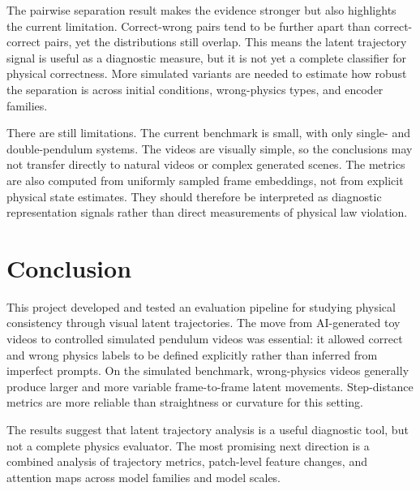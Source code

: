 \documentclass[final-report]{report-template}
\begin{document}
The pairwise separation result makes the evidence stronger but also highlights
the current limitation. Correct-wrong pairs tend to be further apart than
correct-correct pairs, yet the distributions still overlap. This means the
latent trajectory signal is useful as a diagnostic measure, but it is not yet a
complete classifier for physical correctness. More simulated variants are
needed to estimate how robust the separation is across initial conditions,
wrong-physics types, and encoder families.

There are still limitations. The current benchmark is small, with only single-
and double-pendulum systems. The videos are visually simple, so the conclusions
may not transfer directly to natural videos or complex generated scenes. The
metrics are also computed from uniformly sampled frame embeddings, not from
explicit physical state estimates. They should therefore be interpreted as
diagnostic representation signals rather than direct measurements of physical
law violation.



\section{Conclusion}
This project developed and tested an evaluation pipeline for studying physical
consistency through visual latent trajectories. The move from AI-generated toy
videos to controlled simulated pendulum videos was essential: it allowed correct
and wrong physics labels to be defined explicitly rather than inferred from
imperfect prompts. On the simulated benchmark, wrong-physics videos generally
produce larger and more variable frame-to-frame latent movements. Step-distance
metrics are more reliable than straightness or curvature for this setting.

The results suggest that latent trajectory analysis is a useful diagnostic tool,
but not a complete physics evaluator. The most promising next direction is a
combined analysis of trajectory metrics, patch-level feature changes, and
attention maps across model families and model scales.


\end{document}
